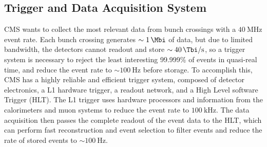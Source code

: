 \subsection{Trigger and Data Acquisition System}
CMS wants to collect the most relevant data from bunch crossings with a $\SI{40}{\MHz}$ event rate.
Each bunch crossing generates $\sim \SI{1}{\Mbi}$ of data, but due to limited bandwidth, the detectors cannot readout and store $\sim \SI{40}{\Tbi \per \s}$, so a trigger system is necessary to reject the least interesting 99.999\% of events in quasi-real time, and reduce the event rate to $\sim \SI{100}{\Hz}$ before storage.
To accomplish this, CMS has a highly reliable and efficient trigger system, composed of detector electronics, a L1 hardware trigger, a readout network, and a High Level software Trigger (HLT).
The L1 trigger uses hardware processors and information from the calorimeters and muon systems to reduce the event rate to $\SI{100}{\kHz}$.
The data acquisition then passes the complete readout of the event data to the HLT, which can perform fast reconstruction and event selection to filter events and reduce the rate of stored events to $\sim \SI{100}{\Hz}$.

